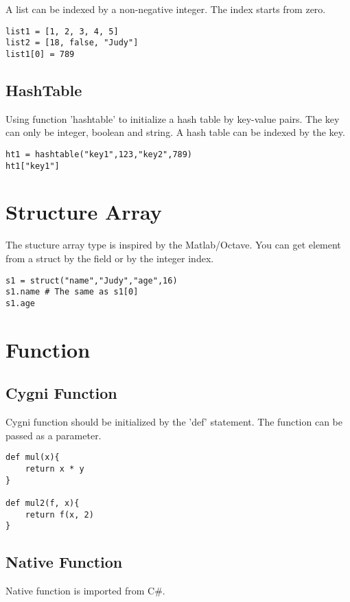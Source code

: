 A list can be indexed by a non-negative integer. The index starts from zero.
\begin{lstlisting}
list1 = [1, 2, 3, 4, 5]
list2 = [18, false, "Judy"]
list1[0] = 789
\end{lstlisting}

\subsection{HashTable}
Using function 'hashtable' to initialize a hash table by key-value pairs. The key can only be integer, boolean and string.
A hash table can be indexed by the key.
\begin{lstlisting}
ht1 = hashtable("key1",123,"key2",789)
ht1["key1"]
\end{lstlisting}

\section{Structure Array}
The stucture array type is inspired by the Matlab/Octave. You can get element from a struct by the field or by the integer index.
\begin{lstlisting}
s1 = struct("name","Judy","age",16)
s1.name # The same as s1[0]
s1.age
\end{lstlisting}

\section{Function}
\subsection{Cygni Function}
Cygni function should be initialized by the 'def' statement. The function can be passed as a parameter. 
\begin{lstlisting}
def mul(x){
	return x * y
}

def mul2(f, x){
	return f(x, 2)
}
\end{lstlisting}

\subsection{Native Function}
Native function is imported from C\#.

